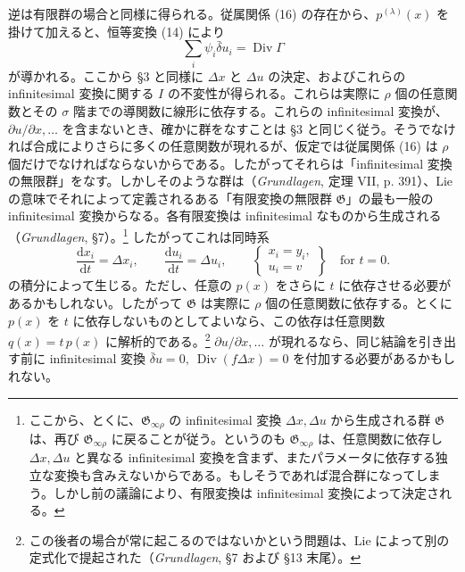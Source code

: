 \documentclass[11pt]{article}
\newcommand{\D}{\Delta}
\providecommand{\dd}{\mathrm d}
\providecommand{\Div}{\operatorname{Div}}
\providecommand{\G}{\mathfrak G}
\providecommand{\bd}{\bar{\delta}}
\providecommand{\p}{\partial}
\begin{document}
逆は有限群の場合と同様に得られる。従属関係 (16) の存在から、\(p^{(\lambda)}(x)\) を掛けて加えると、恒等変換 (14) により
\[
\sum_i\psi_i\bd u_i=\Div\Gamma
\]
が導かれる。ここから \S{}3 と同様に \(\D x\) と \(\D u\) の決定、およびこれらの infinitesimal 変換に関する \(I\) の不変性が得られる。これらは実際に \(\rho\) 個の任意関数とその \(\sigma\) 階までの導関数に線形に依存する。これらの infinitesimal 変換が、\(\p u/\p x,\ldots\) を含まないとき、確かに群をなすことは \S{}3 と同じく従う。そうでなければ合成によりさらに多くの任意関数が現れるが、仮定では従属関係 (16) は \(\rho\) 個だけでなければならないからである。したがってそれらは「infinitesimal 変換の無限群」をなす。しかしそのような群は（\emph{Grundlagen}, 定理 VII, p. 391）、Lie の意味でそれによって定義されるある「有限変換の無限群 \(\G\)」の最も一般の infinitesimal 変換からなる。各有限変換は infinitesimal なものから生成される（\emph{Grundlagen}, \S{}7）。\footnote{ここから、とくに、\(\G_{\infty\rho}\) の infinitesimal 変換 \(\D x,\D u\) から生成される群 \(\G\) は、再び \(\G_{\infty\rho}\) に戻ることが従う。というのも \(\G_{\infty\rho}\) は、任意関数に依存し \(\D x,\D u\) と異なる infinitesimal 変換を含まず、またパラメータに依存する独立な変換も含みえないからである。もしそうであれば混合群になってしまう。しかし前の議論により、有限変換は infinitesimal 変換によって決定される。} したがってこれは同時系
\[
\frac{\dd x_i}{\dd t}=\D x_i,\qquad
\frac{\dd u_i}{\dd t}=\D u_i,\qquad
\left\{\begin{array}{l}
x_i=y_i,\\
u_i=v
\end{array}\right\}
\quad\text{for }t=0.
\]
の積分によって生じる。ただし、任意の \(p(x)\) をさらに \(t\) に依存させる必要があるかもしれない。したがって \(\G\) は実際に \(\rho\) 個の任意関数に依存する。とくに \(p(x)\) を \(t\) に依存しないものとしてよいなら、この依存は任意関数 \(q(x)=t\,p(x)\) に解析的である。\footnote{この後者の場合が常に起こるのではないかという問題は、Lie によって別の定式化で提起された（\emph{Grundlagen}, \S{}7 および \S{}13 末尾）。} \(\p u/\p x,\ldots\) が現れるなら、同じ結論を引き出す前に infinitesimal 変換 \(\bd u=0,\ \Div(f\D x)=0\) を付加する必要があるかもしれない。
\end{document}
